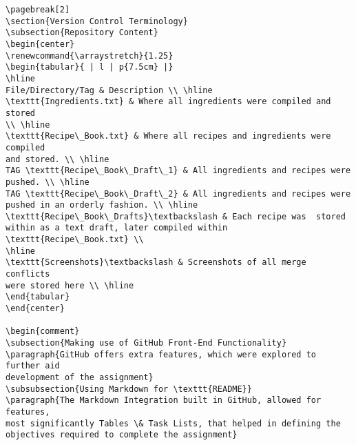 \documentclass[a4paper,twoside,12pt]{article}
\begin{document}
\begin{verbatim}
\pagebreak[2]
\section{Version Control Terminology}
\subsection{Repository Content}
\begin{center}
\renewcommand{\arraystretch}{1.25}
\begin{tabular}{ | l | p{7.5cm} |}
\hline
File/Directory/Tag & Description \\ \hline
\texttt{Ingredients.txt} & Where all ingredients were compiled and stored 
\\ \hline
\texttt{Recipe\_Book.txt} & Where all recipes and ingredients were compiled 
and stored. \\ \hline
TAG \texttt{Recipe\_Book\_Draft\_1} & All ingredients and recipes were 
pushed. \\ \hline
TAG \texttt{Recipe\_Book\_Draft\_2} & All ingredients and recipes were 
pushed in an orderly fashion. \\ \hline
\texttt{Recipe\_Book\_Drafts}\textbackslash & Each recipe was  stored 
within as a text draft, later compiled within \texttt{Recipe\_Book.txt} \\ 
\hline
\texttt{Screenshots}\textbackslash & Screenshots of all merge conflicts 
were stored here \\ \hline
\end{tabular}
\end{center}

\begin{comment}
\subsection{Making use of GitHub Front-End Functionality}
\paragraph{GitHub offers extra features, which were explored to further aid 
development of the assignment}
\subsubsection{Using Markdown for \texttt{README}}
\paragraph{The Markdown Integration built in GitHub, allowed for features, 
most significantly Tables \& Task Lists, that helped in defining the 
objectives required to complete the assignment}

\end{verbatim}
\end{document}
